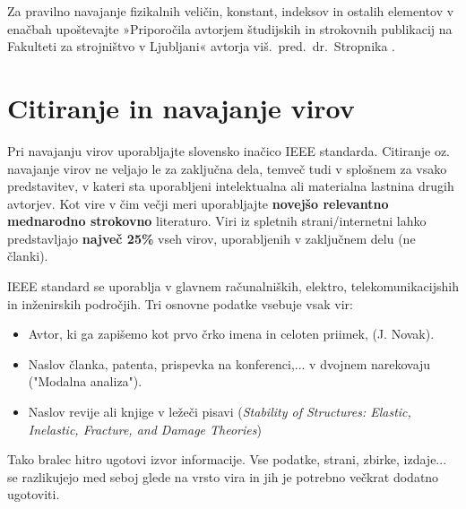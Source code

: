 Za pravilno navajanje fizikalnih veličin, konstant, indeksov in ostalih elementov v enačbah upoštevajte »Priporočila avtorjem študijskih in strokovnih publikacij na Fakulteti za strojništvo v Ljubljani« avtorja viš.~pred.~dr.~Stropnika \cite{stropnik_1997}.

\section{Citiranje in navajanje virov}\label{sec:citiranje}

Pri navajanju virov uporabljajte slovensko inačico IEEE standarda. Citiranje 
oz. navajanje virov ne veljajo le za zaključna dela, temveč tudi v splošnem za 
vsako predstavitev, v kateri sta uporabljeni intelektualna ali materialna 
lastnina drugih avtorjev. Kot vire v čim večji meri uporabljajte 
\textbf{novejšo relevantno mednarodno strokovno} literaturo. Viri iz spletnih 
strani/internetni lahko predstavljajo \textbf{največ 25\%} vseh virov, 
uporabljenih v zaključnem delu (ne članki).

IEEE standard se uporablja v glavnem računalniških, elektro, 
telekomunikacijshih in inženirskih področjih. Tri osnovne podatke vsebuje vsak 
vir:
\begin{itemize}
	\item Avtor, ki ga zapišemo kot prvo črko imena in celoten priimek, (J. 
	Novak).
	\item Naslov članka, patenta, prispevka na konferenci,...  v dvojnem 
	narekovaju ("Modalna analiza").
	\item Naslov revije ali knjige v ležeči pisavi (\emph{Stability of 
	Structures: Elastic, Inelastic, Fracture, and Damage Theories})
\end{itemize}
Tako bralec hitro ugotovi izvor informacije. Vse podatke, strani, zbirke, 
izdaje...  se razlikujejo med seboj glede na vrsto vira in jih je potrebno 
večkrat dodatno ugotoviti. 

